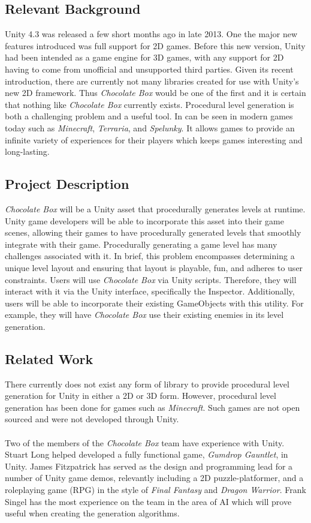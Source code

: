 \documentclass[pdftex,12pt,letter]{article}
\begin{document}
\subsection{Relevant Background}
Unity 4.3 was released a few short months ago in late 2013. One the major new features introduced was full support for 2D games. Before this new version, Unity had been intended as a game engine for 3D games, with any support for 2D having to come from unofficial and unsupported third parties. Given its recent introduction, there are currently not many libraries created for use with Unity's new 2D framework. Thus \textit{Chocolate Box} would be one of the first and it is certain that nothing like \textit{Chocolate Box} currently exists. Procedural level generation is both a challenging problem and a useful tool. In can be seen in modern games today such as \textit{Minecraft}, \textit{Terraria}, and \textit{Spelunky}. It allows games to provide an infinite variety of experiences for their players which keeps games interesting and long-lasting.
\subsection{Project Description}
\textit{Chocolate Box} will be a Unity asset that procedurally generates levels at runtime. Unity game developers will be able to incorporate this asset into their game scenes, allowing their games to have procedurally generated levels that smoothly integrate with their game. Procedurally generating a game level has many challenges associated with it. In brief, this problem encompasses determining a unique level layout and ensuring that layout is playable, fun, and adheres to user constraints. Users will use \textit{Chocolate Box} via Unity scripts. Therefore, they will interact with it via the Unity interface, specifically the Inspector. Additionally, users will be able to incorporate their existing GameObjects with this utility. For example, they will have \textit{Chocolate Box} use their existing enemies in its level generation.
\subsection{Related Work}
There currently does not exist any form of library to provide procedural level generation for Unity in either a 2D or 3D form. However, procedural level generation has been done for games such as \textit{Minecraft}. Such games are not open sourced and were not developed through Unity. 
\\\\
Two of the members of the \textit{Chocolate Box} team have experience with Unity. Stuart Long helped developed a fully functional game, \textit{Gumdrop Gauntlet}, in Unity. James Fitzpatrick has served as the design and programming lead for a number of Unity game demos, relevantly including a 2D puzzle-platformer, and a roleplaying game (RPG) in the style of \textit{Final Fantasy} and \textit{Dragon Warrior}. Frank Singel has the most experience on the team in the area of AI which will prove useful when creating the generation algorithms.
\end{document}
